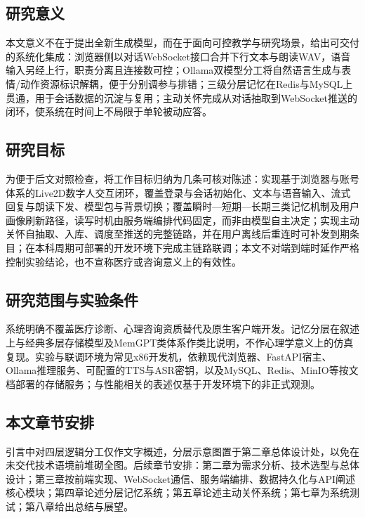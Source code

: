 \documentclass{base}
\begin{document}
\subsection{研究意义}

本文意义不在于提出全新生成模型，而在于面向可控教学与研究场景，给出可交付的系统化集成：浏览器侧以对话WebSocket接口合并下行文本与朗读WAV，语音输入另经上行，职责分离且连接数可控；Ollama双模型分工将自然语言生成与表情/动作资源标识解耦，便于分别调参与排错；三级分层记忆在Redis与MySQL上贯通，用于会话数据的沉淀与复用；主动关怀完成从对话抽取到WebSocket推送的闭环，使系统在时间上不局限于单轮被动应答。

\subsection{研究目标}

为便于后文对照检查，将工作目标归纳为几条可核对陈述：实现基于浏览器与账号体系的Live2D数字人交互闭环，覆盖登录与会话初始化、文本与语音输入、流式回复与朗读下发、模型包与背景切换；覆盖瞬时—短期—长期三类记忆机制及用户画像刷新路径，读写时机由服务端编排代码固定，而非由模型自主决定；实现主动关怀自抽取、入库、调度至推送的完整链路，并在用户离线后重连时可补发到期条目；在本科周期可部署的开发环境下完成主链路联调；本文不对端到端时延作严格控制实验结论，也不宣称医疗或咨询意义上的有效性。

\subsection{研究范围与实验条件}

系统明确不覆盖医疗诊断、心理咨询资质替代及原生客户端开发。记忆分层在叙述上与经典多层存储模型及MemGPT类体系作类比说明\cite{Atkinson1968,MemGPT2023}，不作心理学意义上的仿真复现。实验与联调环境为常见x86开发机，依赖现代浏览器、FastAPI宿主、Ollama推理服务、可配置的TTS与ASR密钥，以及MySQL、Redis、MinIO等按文档部署的存储服务；与性能相关的表述仅基于开发环境下的非正式观测。

\subsection{本文章节安排}

引言中对四层逻辑分工仅作文字概述，分层示意图置于第二章总体设计处，以免在未交代技术语境前堆砌全图。后续章节安排：第二章为需求分析、技术选型与总体设计；第三章按前端实现、WebSocket通信、服务端编排、数据持久化与API阐述核心模块；第四章论述分层记忆系统；第五章论述主动关怀系统；第七章为系统测试；第八章给出总结与展望。
\end{document}
